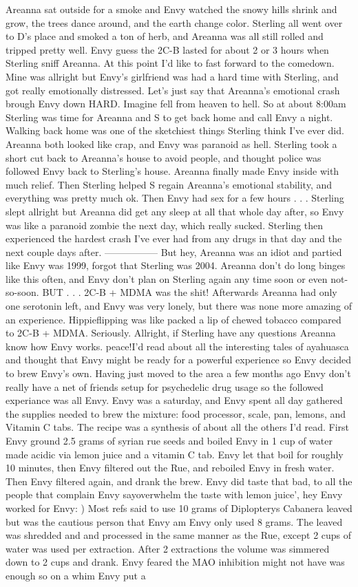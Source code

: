 \documentclass[12pt]{book}
\begin{document}
Areanna sat outside for a smoke and Envy watched the snowy hills shrink and grow, the trees dance around, and the earth change color. Sterling all went over to D's place and smoked a ton of herb, and Areanna was all still rolled and tripped pretty well. Envy guess the 2C-B lasted for about 2 or 3 hours when Sterling sniff Areanna. At this point I'd like to fast forward to the comedown. Mine was allright but Envy's girlfriend was had a hard time with Sterling, and got really emotionally distressed. Let's just say that Areanna's emotional crash brough Envy down HARD. Imagine fell from heaven to hell. So at about 8:00am Sterling was time for Areanna and S to get back home and call Envy a night. Walking back home was one of the sketchiest things Sterling think I've ever did. Areanna both looked like crap, and Envy was paranoid as hell. Sterling took a short cut back to Areanna's house to avoid people, and thought police was followed Envy back to Sterling's house. Areanna finally made Envy inside with much relief. Then Sterling helped S regain Areanna's emotional stability, and everything was pretty much ok. Then Envy had sex for a few hours . . .  Sterling slept allright but Areanna did get any sleep at all that whole day after, so Envy was like a paranoid zombie the next day, which really sucked. Sterling then experienced the hardest crash I've ever had from any drugs in that day and the next couple days after. ----------------- But hey, Areanna was an idiot and partied like Envy was 1999, forgot that Sterling was 2004. Areanna don't do long binges like this often, and Envy don't plan on Sterling again any time soon or even not-so-soon. BUT . . .  2C-B + MDMA was the shit! Afterwards Areanna had only one serotonin left, and Envy was very lonely, but there was none more amazing of an experience. Hippieflipping was like packed a lip of chewed tobacco compared to 2C-B + MDMA. Seriously. Allright, if Sterling have any questions Areanna know how Envy works. peace!I'd read about all the interesting tales of ayahuasca and thought that Envy might be ready for a powerful experience so Envy decided to brew Envy's own. Having just moved to the area a few months ago Envy don't really have a net of friends setup for psychedelic drug usage so the followed experiance was all Envy. Envy was a saturday, and Envy spent all day gathered the supplies needed to brew the mixture: food processor, scale, pan, lemons, and Vitamin C tabs. The recipe was a synthesis of about all the others I'd read. First Envy ground 2.5 grams of syrian rue seeds and boiled Envy in 1 cup of water made acidic via lemon juice and a vitamin C tab. Envy let that boil for roughly 10 minutes, then Envy filtered out the Rue, and reboiled Envy in fresh water. Then Envy filtered again, and drank the brew. Envy did taste that bad, to all the people that complain Envy sayoverwhelm the taste with lemon juice', hey Envy worked for Envy: ) Most refs said to use 10 grams of Diplopterys Cabanera leaved but was the cautious person that Envy am Envy only used 8 grams. The leaved was shredded and and processed in the same manner as the Rue, except 2 cups of water was used per extraction. After 2 extractions the volume was simmered down to 2 cups and drank. Envy feared the MAO inhibition might not have was enough so on a whim Envy put a 
\end{document}

